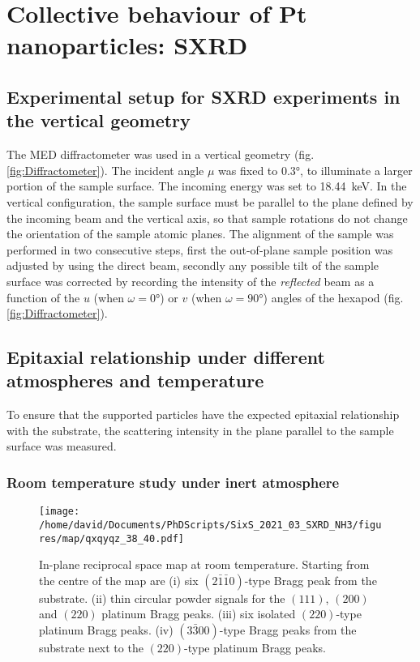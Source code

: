 \section{Collective behaviour of Pt nanoparticles: SXRD}

\subsection{Experimental setup for SXRD experiments in the vertical geometry}\label{sec:SXRDSetupV}

The MED diffractometer was used in a vertical geometry (fig. \ref{fig:Diffractometer}).
The incident angle $\mu$ was fixed to \ang{0.3}, to illuminate a larger portion of the sample surface.
The incoming energy was set to \qty{18.44}{\keV}.
In the vertical configuration, the sample surface must be parallel to the plane defined by the incoming beam and the vertical axis, so that sample rotations do not change the orientation of the sample atomic planes.
The alignment of the sample was performed in two consecutive steps, first the out-of-plane sample position was adjusted by using the direct beam, secondly any possible tilt of the sample surface was corrected by recording the intensity of the \textit{reflected} beam as a function of the $u$ (when $\omega=\ang{0}$) or $v$ (when $\omega=\ang{90}$) angles of the hexapod (fig. \ref{fig:Diffractometer}).

\subsection{Epitaxial relationship under different atmospheres and temperature}

To ensure that the  supported particles have the expected epitaxial relationship with the substrate, the scattering intensity in the plane parallel to the sample surface was measured.

\subsubsection{Room temperature study under inert atmosphere}

\begin{figure}[!htb]
    \centering
    \texttt{[image: /home/david/Documents/PhDScripts/SixS\_2021\_03\_SXRD\_NH3/figures/map/qxqyqz\_38\_40.pdf]}
    \caption{
        In-plane reciprocal space map at room temperature.
        Starting from the centre of the map are (i) six $(2\bar{1}\bar{1}0)$-type Bragg peak from the substrate.
        (ii) thin circular powder signals for the $(111)$, $(200)$ and $(220)$ platinum Bragg peaks.
        (iii) six isolated $(220)$-type platinum Bragg peaks.
        (iv) $(3\bar{3}00)$-type Bragg peaks from the substrate next to the $(220)$-type platinum Bragg peaks.
    }
    \label{fig:QxQyMap}
\end{figure}

